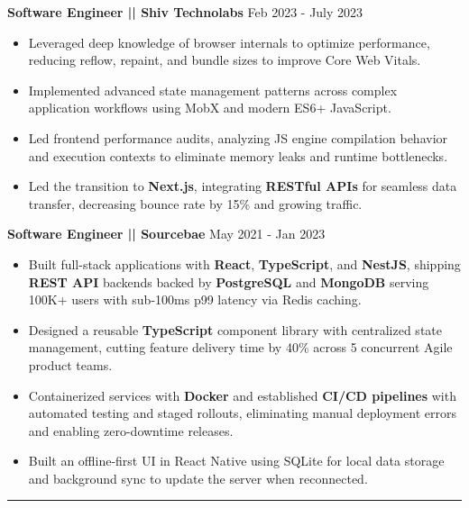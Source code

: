 \documentclass[100pt,a4paper]{article}
\newcommand{\sectionline}{
\begin{center}
\vspace{-10pt}
\rule{1\textwidth}{0.5pt}
\end{center}
\vspace{1pt}
}
\begin{document}
\vspace{5pt}
\textbf{Software Engineer || Shiv Technolabs}
\hfill Feb 2023 - July 2023
\begin{itemize}
\vspace{2pt}
\item {Leveraged deep knowledge of browser internals to optimize performance, reducing reflow, repaint, and bundle sizes to improve Core Web Vitals.}
\item {Implemented advanced state management patterns across complex application workflows using MobX and modern ES6+ JavaScript.}
\item {Led frontend performance audits, analyzing JS engine compilation behavior and execution contexts to eliminate memory leaks and runtime bottlenecks.}
\item {Led the transition to \textbf{Next.js}, integrating \textbf{RESTful APIs} for seamless data transfer, decreasing bounce rate by 15\% and growing traffic.}
\end{itemize}

\vspace{5pt}
\textbf{Software Engineer || Sourcebae}
\hfill May 2021 - Jan 2023
\begin{itemize}
\vspace{2pt}
\item {Built full-stack applications with \textbf{React}, \textbf{TypeScript}, and \textbf{NestJS}, shipping \textbf{REST API} backends backed by \textbf{PostgreSQL} and \textbf{MongoDB} serving 100K+ users with sub-100ms p99 latency via Redis caching.}
\item {Designed a reusable \textbf{TypeScript} component library with centralized state management, cutting feature delivery time by 40\% across 5 concurrent Agile product teams.}
\item {Containerized services with \textbf{Docker} and established \textbf{CI/CD pipelines} with automated testing and staged rollouts, eliminating manual deployment errors and enabling zero-downtime releases.}
\item {Built an offline-first UI in React Native using SQLite for local data storage and background sync to update the server when reconnected.}
\end{itemize}

\sectionline
\end{document}
